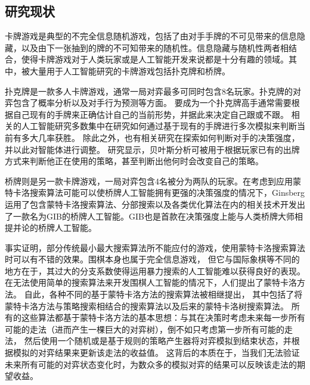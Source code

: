 \subsection{研究现状}
\label{section:RelatedWork}

卡牌游戏是典型的不完全信息随机游戏，包括了由对手手牌的不可见带来的信息隐藏，以及由下一张抽到的牌的不可知带来的随机性。信息隐藏与随机性两者相结合，使得卡牌游戏对于人类玩家或是人工智能开发来说都是十分有趣的领域\cite{bowling2008strategy}。其中，被大量用于人工智能研究的卡牌游戏包括扑克牌和桥牌\cite{schaeffer2001gamut}。

扑克牌是一款多人卡牌游戏，通常一局对弈最多可同时包含8名玩家。扑克牌的对弈包含了概率分析以及对手行为预测等方面\cite{billings2003approximating,billings2002challenge}。
要成为一个扑克牌高手通常需要根据自己现有的手牌来正确估计自己的当前形势，并据此来决定自己跟或不跟。
相关的人工智能研究多数集中在研究如何通过基于现有的手牌进行多次模拟来判断当前有多大几率获胜\cite{billings2004game}。
除此之外，也有相关研究在探索如何判断对手的决策强度，并以此对智能体进行调整。
研究显示，贝叶斯分析可被用于根据玩家已有的出牌方式来判断他正在使用的策略，甚至判断出他何时会改变自己的策略\cite{baker2007bayesian,baker2008can}。

桥牌则是另一款卡牌游戏，一局对弈包含4名被分为两队的玩家。在考虑到应用蒙特卡洛搜索算法可能可以使桥牌人工智能拥有更强的决策强度的情况下，Ginsberg运用了包含蒙特卡洛搜索算法、分部搜索\cite{ginsberg1996partition}以及各类优化算法在内的相关技术开发出了一款名为GIB的桥牌人工智能。GIB也是首款在决策强度上能与人类桥牌大师相提并论的桥牌人工智能。

事实证明，部分传统最小最大搜索算法所不能应付的游戏，使用蒙特卡洛搜索算法时可以有不错的效果。围棋本身也属于完全信息游戏，
但它与国际象棋\cite{campbell2002deep}等不同的地方在于，其过大的分支系数使得运用暴力搜索的人工智能难以获得良好的表现。
在无法使用简单的搜索算法来开发围棋人工智能的情况下，人们提出了蒙特卡洛方法\cite{brugmann1993monte}。
自此，各种不同的基于蒙特卡洛方法的搜索算法被相继提出\cite{chaslot2006monte}，
其中包括了将蒙特卡洛方法与策略搜索相结合的搜索算法\cite{cazenave2005combining}以及后来的蒙特卡洛树搜索算法\cite{chaslot2007progressive}。
所有的这些算法都基于蒙特卡洛方法的基本思想：与其在决策时考虑未来每一步所有可能的走法（进而产生一棵巨大的对弈树），倒不如只考虑第一步所有可能的走法，
然后使用一个随机或是基于规则的策略产生器将对弈模拟到结束状态，并根据模拟的对弈结果来更新该走法的收益值。
这背后的本质在于，当我们无法验证未来所有可能的对弈状态变化时，为数众多的模拟对弈的结果可以反映该走法的期望收益。

